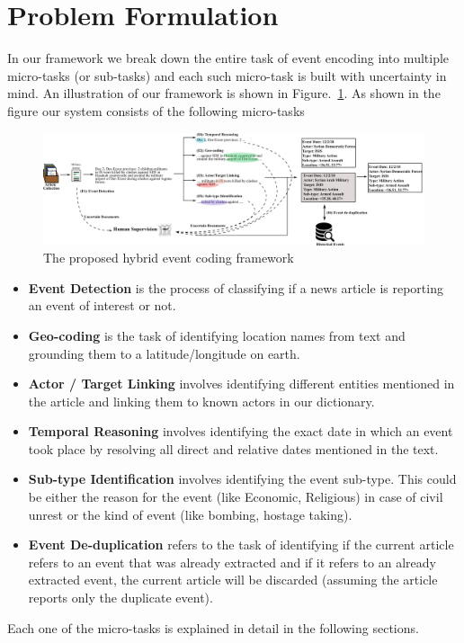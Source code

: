 \section{Problem Formulation}

In our framework we break down the entire task of event encoding into multiple micro-tasks  (or sub-tasks) and each such micro-task is built with uncertainty in mind. An illustration of our framework is shown in Figure.~\ref{fig:EventFramework}. As shown in the figure our system consists of the following micro-tasks
\begin{figure}
    \centering
    \includegraphics[width=\textwidth]{figures/eventCoding_framework.pdf}
    \caption{The proposed hybrid event coding framework}
    \label{fig:EventFramework}
\end{figure}

\begin{itemize}
    \item \textbf{Event Detection} is the process of classifying if a news article is reporting an event of interest or not.
    \item \textbf{Geo-coding} is the task of identifying location names from text and grounding them to a latitude/longitude on earth.  
    \item \textbf{Actor / Target Linking} involves identifying different entities mentioned in the article and linking them to known actors in our dictionary. 
    \item \textbf{Temporal Reasoning} involves identifying the exact date in which an event took place by resolving all direct and relative dates mentioned in the text.
    \item \textbf{Sub-type Identification} involves identifying the event sub-type. This could be either the reason for the event (like Economic, Religious) in case of civil unrest or the kind of event (like bombing, hostage taking).
    \item \textbf{Event De-duplication} refers to the task of identifying if the current article refers to an event that was already extracted and if it refers to an already extracted event, the current article will be discarded (assuming the article reports only the duplicate event).
\end{itemize}

Each one of the micro-tasks is explained in detail in the following sections.

